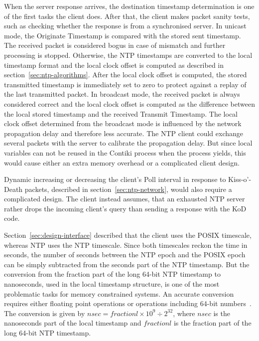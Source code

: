 When the server response arrives,
the destination timestamp determination is one of the first tasks the client does.
After that, the client makes packet sanity tests, such as
checking whether the response is from a synchronised server.
In unicast mode, the Originate Timestamp is compared with the stored sent timestamp.
The received packet is considered bogus in case of mismatch and further processing is stopped.
Otherwise, the NTP timestamps are converted to the local timestamp format and
the local clock offset is computed as described in section~\ref{sec:ntp-algorithms}.
After the local clock offset is computed,
the stored transmitted timestamp is immediately set to zero
to protect against a replay of the last transmitted packet.
In broadcast mode, the received packet is always considered correct
and the local clock offset is computed as the difference between the local stored timestamp
and the received Transmit Timestamp.
The local clock offset determined from the broadcast mode
is influenced by the network propagation delay and therefore less accurate.
The NTP client could exchange several packets with the server to calibrate the propagation delay.
But since local variables can not be reused in the Contiki process when the process yields,
this would cause either an extra memory overhead or a complicated client design.

Dynamic increasing or decreasing the client's Poll interval in response to
Kiss-o'-Death packets, described in section~\ref{sec:ntp-network}, would also
require a complicated design.
The client instead assumes, that an exhausted NTP server rather drops the incoming
client's query than sending a response with the KoD code.

Section~\ref{sec:design-interface} described that the client uses the POSIX timescale,
whereas NTP uses the NTP timescale.
Since both timescales reckon the time in seconds,
the number of seconds between the NTP epoch and the POSIX epoch
can be simply subtracted from the seconds part of the NTP timestamp.
But the conversion from the fraction part of the long 64-bit NTP timestamp to nanoseconds,
used in the local timestamp structure,
is one of the most problematic tasks for memory constrained systems.
An accurate conversion requires either floating point operations or operations including 64-bit numbers~\cite{c99}.
The conversion is given by
$nsec = fractionl \times 10^9 \div 2^{32}$, where $nsec$ is the nanoseconds part of the local timestamp
and $fractionl$ is the fraction part of the long 64-bit NTP timestamp.

